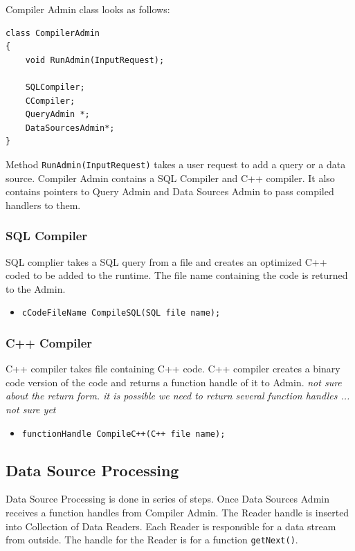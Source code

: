 \documentclass[11pt]{article}
\begin{document}
\noindent Compiler Admin class looks as follows:
\begin{verbatim}
class CompilerAdmin
{
    void RunAdmin(InputRequest);
	
    SQLCompiler;
    CCompiler;
    QueryAdmin *;
    DataSourcesAdmin*;
}
\end{verbatim}

Method {\tt RunAdmin(InputRequest)} takes a user request to add a query or a data source. Compiler Admin contains a SQL Compiler and C++ compiler. It also contains pointers to Query Admin and Data Sources Admin to pass compiled handlers to them.

\subsubsection{SQL Compiler}

SQL complier takes a SQL query from a file and creates an optimized C++ coded to be added to the runtime. The file name containing the code is returned to the Admin.

\begin{itemize}
	\item {\tt cCodeFileName CompileSQL(SQL file name);}
\end{itemize}

\subsubsection{C++ Compiler}

C++ compiler takes file containing C++ code. C++ compiler creates a binary code version of the code and returns a function handle of it to Admin. \emph{not sure about the return form. it is possible we need to return several function handles ... not sure yet}

\begin{itemize}
	\item {\tt functionHandle CompileC++(C++ file name);}
\end{itemize}

\subsection{Data Source Processing}

Data Source Processing is done in series of steps. Once Data Sources Admin receives a function handles from Compiler Admin. The Reader handle is inserted into Collection of Data Readers. Each Reader is responsible for a data stream from outside. The handle for the Reader is for a function {\tt getNext()}.
\end{document}
